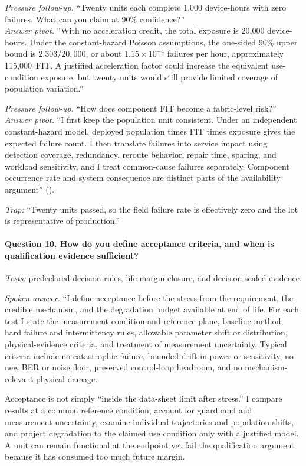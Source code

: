 \textit{Pressure follow-up.} ``Twenty units each complete 1{,}000 device-hours
with zero failures. What can you claim at 90\% confidence?''\\
\textit{Answer pivot.} ``With no acceleration credit, the total exposure is
20{,}000 device-hours. Under the constant-hazard Poisson assumptions, the
one-sided 90\% upper bound is $2.303/20{,}000$, or about
$1.15\times10^{-4}$ failures per hour, approximately 115{,}000~FIT. A justified
acceleration factor could increase the equivalent use-condition exposure, but
twenty units would still provide limited coverage of population variation.''

\textit{Pressure follow-up.} ``How does component FIT become a fabric-level
risk?''\\
\textit{Answer pivot.} ``I first keep the population unit consistent. Under an
independent constant-hazard model, deployed population times FIT times exposure
gives the expected failure count. I then translate failures into service impact
using detection coverage, redundancy, reroute behavior, repair time, sparing,
and workload sensitivity, and I treat common-cause failures separately.
Component occurrence rate and system consequence are distinct parts of the
availability argument''
().

\textit{Trap:} ``Twenty units passed, so the field failure rate is effectively
zero and the lot is representative of production.''

\paragraph{Question 10. How do you define acceptance criteria, and when is
qualification evidence sufficient?}
\textit{Tests:} predeclared decision rules, life-margin closure, and
decision-scaled evidence.

\textit{Spoken answer.}
``I define acceptance before the stress from the requirement, the credible
mechanism, and the degradation budget available at end of life. For each test I
state the measurement condition and reference plane, baseline method, hard
failure and intermittency rules, allowable parameter shift or distribution,
physical-evidence criteria, and treatment of measurement uncertainty. Typical
criteria include no catastrophic failure, bounded drift in power or
sensitivity, no new BER or noise floor, preserved control-loop headroom, and no
mechanism-relevant physical damage.

Acceptance is not simply ``inside the data-sheet limit after stress.'' I compare
results at a common reference condition, account for guardband and measurement
uncertainty, examine individual trajectories and population shifts, and project
degradation to the claimed use condition only with a justified model. A unit can
remain functional at the endpoint yet fail the qualification argument because
it has consumed too much future margin.

